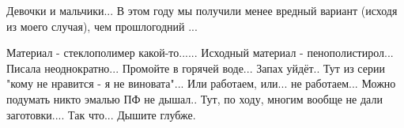 
 
 
 
 

\qqSecCmt


Девочки и мальчики... В этом году мы получили менее вредный вариант (исходя из
моего случая), чем прошлогодний ...

Материал - стеклополимер какой-то...... Исходный материал - пенополистирол...
Писала неоднократно... Промойте в горячей воде... Запах уйдёт.. Тут из серии
"кому не нравится - я не виновата"... Или работаем, или... не работаем... Можно
подумать никто эмалью ПФ не дышал.. Тут, по ходу, многим вообще не дали
заготовки.... Так что... Дышите глубже.

